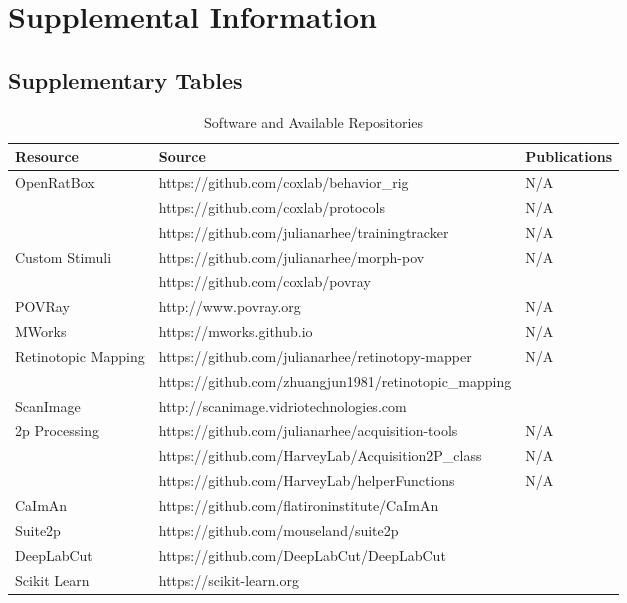 \chapter{Supplemental Information}
\label{supplementals}


\section{Supplementary Tables}

\begin{table}[ht]
  \caption{Software and Available Repositories}
  \centering
  \footnotesize
  \begin{tabular}{ p{1.8cm}p{7.7cm}p{3.9cm}  }
    \toprule
    Resource & Source & Publications \\
    \midrule
    OpenRatBox  & https://github.com/coxlab/behavior\_rig & N/A \\ 
                & https://github.com/coxlab/protocols & N/A \\ 
                & https://github.com/julianarhee/trainingtracker & N/A \\ 
    \midrule
    Custom Stimuli & https://github.com/julianarhee/morph-pov & N/A \\
                   & https://github.com/coxlab/povray & \citet{Zoccolan2009} \\
    POVRay  & http://www.povray.org & N/A \\
    MWorks  & https://mworks.github.io & N/A \\
    \midrule
    Retinotopic Mapping & https://github.com/julianarhee/retinotopy-mapper & N/A \\ 
                        & https://github.com/zhuangjun1981/retinotopic\_mapping & \citealt{Zhuang2017}\\
    \midrule
    ScanImage   & http://scanimage.vidriotechnologies.com & \citet{Pologruto2003} \\ 
    \midrule
    2p Processing  & https://github.com/julianarhee/acquisition-tools & N/A \\ 
                   & https://github.com/HarveyLab/Acquisition2P\_class & N/A \\
                   & https://github.com/HarveyLab/helperFunctions & N/A \\
    CaImAn & https://github.com/flatironinstitute/CaImAn  & \citet{Giovannucci2019,Pnevmatikakis2019} \\
    Suite2p & https://github.com/mouseland/suite2p & \cite{Pachitariu2017} \\
    \midrule
    DeepLabCut   & https://github.com/DeepLabCut/DeepLabCut & \citet{Mathis2018,Nath2019} \\
    \midrule
    Scikit Learn   & https://scikit-learn.org & \citet{Pedregosa2011} \\
    \bottomrule
  \end{tabular}
  \label{tab:software}
\end{table}


